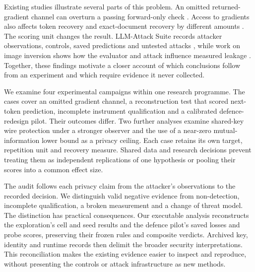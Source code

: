 \documentclass{article}
\begin{document}
Existing studies illustrate several parts of this problem. An omitted
returned-gradient channel can overturn a passing forward-only check
\citep{paper1}. Access to gradients also affects token recovery and
exact-document recovery by different amounts \citep{gradients2026}.
The scoring unit changes the result. LLM-Attack Suite records attacker
observations, controls, saved predictions and untested attacks
\citep{suite2026}, while work on image inversion shows how the evaluator
and attack influence measured leakage \citep{mia2026}. Together, these
findings motivate a closer account of which conclusions follow from
an experiment and which require evidence it never collected.

We examine four experimental campaigns within one research programme.
The cases cover an omitted gradient channel, a reconstruction test that
scored next-token prediction, incomplete instrument qualification and a
calibrated defence-redesign pilot. Their outcomes differ. Two further
analyses examine shared-key wire protection under a stronger observer
and the use of a near-zero mutual-information lower bound as a privacy
ceiling. Each case retains its own target, repetition unit and recovery
measure. Shared data and research decisions prevent treating them as
independent replications of one hypothesis or pooling their scores into
a common effect size.

The audit follows each privacy claim from the attacker's observations to
the recorded decision. We distinguish valid negative evidence from
non-detection, incomplete qualification, a broken measurement and a
change of threat model. The distinction has practical consequences.
Our executable analysis reconstructs the exploration's cell and seed
results and the defence pilot's saved losses and probe scores, preserving
their frozen rules and composite verdicts. Archived key, identity and
runtime records then delimit the broader security interpretations.
This reconciliation makes the existing evidence easier to inspect and
reproduce, without presenting the controls or attack infrastructure as
new methods.







\appendix

\end{document}
